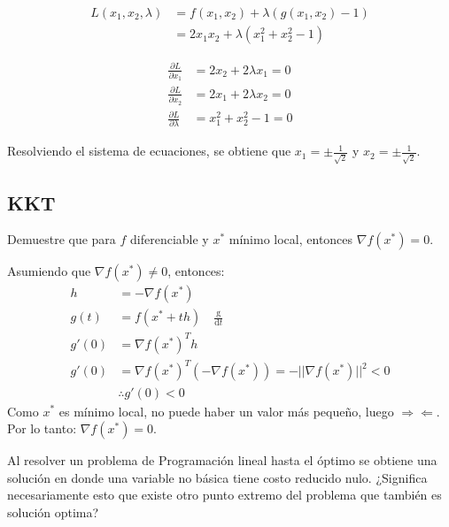 \documentclass{article}
\newenvironment{question}
{\begin{mdframed}[backgroundcolor=white]}
{\end{mdframed}}
\newenvironment{solution}
{\begin{mdframed}[backgroundcolor=lightorange,hidealllines=true]}
{\end{mdframed}}
\begin{document}
\begin{solution}
    \begin{align*}
        L(x_1,x_2,\lambda) & = f(x_1,x_2) + \lambda(g(x_1,x_2)-1) \\
                           & = 2x_1x_2 + \lambda(x_1^2+x_2^2-1)
    \end{align*}

    \begin{align*}
        \frac{\partial L}{\partial x_1}     & = 2x_2 + 2\lambda x_1 = 0 \\
        \frac{\partial L}{\partial x_2}     & = 2x_1 + 2\lambda x_2 = 0 \\
        \frac{\partial L}{\partial \lambda} & = x_1^2 + x_2^2 - 1 = 0
    \end{align*}

    Resolviendo el sistema de ecuaciones, se obtiene que $x_1 = \pm \frac{1}{\sqrt{2}}$ y $x_2 = \pm \frac{1}{\sqrt{2}}$.
\end{solution}

\subsection{KKT} \label{problemas:kkt}
\begin{question}
    Demuestre que para $f$ diferenciable y $x^*$ mínimo local, entonces $\nabla f(x^*)=0$.
\end{question}

\begin{solution}
    Asumiendo que $\nabla f(x^*)\neq 0$, entonces:
    \begin{align*}
        h     & =-\nabla f(x^*)                                             \\
        g(t)  & =f(x^* + th) \quad \frac{\mathrm{g}}{\mathrm{d}t}           \\
        g'(0) & =\nabla f(x^*)^T h                                          \\
        g'(0) & =\nabla f(x^*)^T (-\nabla f(x^*))= -||\nabla f(x^*)||^2 < 0 \\
              & \therefore g'(0) < 0
    \end{align*}
    Como $x^*$ es mínimo local, no puede haber un valor más pequeño, luego $\Rightarrow \! \Leftarrow$. Por lo tanto: $\nabla f(x^*)=0$.
\end{solution}

\begin{question}
    Al resolver un problema de Programación lineal hasta el óptimo se obtiene una solución en donde una variable no básica tiene costo reducido nulo. ¿Significa necesariamente esto que existe otro punto extremo del problema que también es solución optima?
\end{question}
\end{document}
